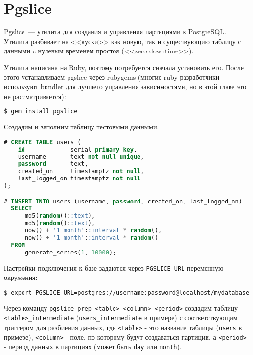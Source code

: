 \section{Pgslice}

\href{https://github.com/ankane/pgslice}{Pgslice}~--- утилита для создания и управления партициями в PostgreSQL. Утилита разбивает на <<куски>> как новую, так и существующию таблицу с данными c нулевым временем простоя (<<zero downtime>>).

Утилита написана на \href{https://www.ruby-lang.org}{Ruby}, поэтому потребуется сначала установить его. После этого устанавливаем pgslice через rubygems (многие ruby разработчики используют \href{http://bundler.io/}{bundler} для лучшего управления зависимостями, но в этой главе это не рассматривается):

\begin{lstlisting}[language=Bash,label=lst:pgslice1,caption=Установка]
$ gem install pgslice
\end{lstlisting}

Создадим и заполним таблицу тестовыми данными:

\begin{lstlisting}[language=SQL,label=lst:pgslice2,caption=Данные]
# CREATE TABLE users (
    id             serial primary key,
    username       text not null unique,
    password       text,
    created_on     timestamptz not null,
    last_logged_on timestamptz not null
);

# INSERT INTO users (username, password, created_on, last_logged_on)
  SELECT
      md5(random()::text),
      md5(random()::text),
      now() + '1 month'::interval * random(),
      now() + '1 month'::interval * random()
  FROM
      generate_series(1, 10000);
\end{lstlisting}

Настройки подключения к базе задаются через \lstinline!PGSLICE_URL! переменную окружения:

\begin{lstlisting}[language=Bash,label=lst:pgslice3,caption=PGSLICE\_URL]
$ export PGSLICE_URL=postgres://username:password@localhost/mydatabase
\end{lstlisting}

Через команду \lstinline!pgslice prep <table> <column> <period>! создадим таблицу \lstinline!<table>_intermediate! (\lstinline!users_intermediate! в примере) с соответствующим триггером для разбиения данных, где \lstinline!<table>! - это название таблицы (\lstinline!users! в примере), \lstinline!<column>! - поле, по которому будут создаваться партиции, а \lstinline!<period>! - период данных в партициях (может быть \lstinline!day! или \lstinline!month!).

